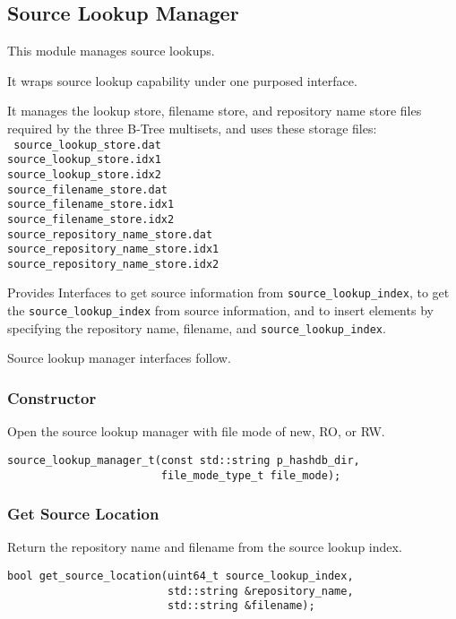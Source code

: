 \documentclass[12pt,twoside]{article}
\begin{document}
\subsection{Source Lookup Manager}
This module manages source lookups.
\begin{compactitem}
\item It wraps source lookup capability under one purposed interface.
\item It manages the lookup store, filename store,
and repository name store files required by the three B-Tree multisets,
and uses these storage files: \\
\texttt{
source\_lookup\_store.dat \\
source\_lookup\_store.idx1 \\
source\_lookup\_store.idx2 \\
source\_filename\_store.dat \\
source\_filename\_store.idx1 \\
source\_filename\_store.idx2 \\
source\_repository\_name\_store.dat \\
source\_repository\_name\_store.idx1 \\
source\_repository\_name\_store.idx2
}
\item Provides Interfaces to get source information
from \texttt{source\_lookup\_index},
to get the \texttt{source\_lookup\_index} from source information,
and to insert elements by specifying the repository name, filename,
and \texttt{source\_lookup\_index}.
\end{compactitem}

Source lookup manager interfaces follow.
\subsubsection{Constructor}
Open the source lookup manager with file mode of new, RO, or RW.
\begin{small}
\begin{verbatim}
source_lookup_manager_t(const std::string p_hashdb_dir,
                        file_mode_type_t file_mode);
\end{verbatim}
\end{small}

\subsubsection{Get Source Location}
Return the repository name and filename from the source lookup index.
\begin{small}
\begin{verbatim}
bool get_source_location(uint64_t source_lookup_index,
                         std::string &repository_name,
                         std::string &filename);
\end{verbatim}
\end{small}
\end{document}
